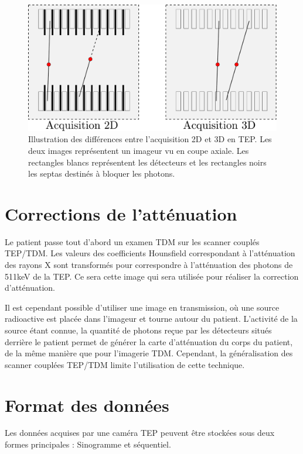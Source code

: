 \begin{figure}
\centering
\includegraphics[width=12cm]{images/2D3D}
\caption[Acquisitions 2D et 3D en TEP]{Illustration des différences entre l'acquisition 2D et 3D en TEP. Les deux images représentent un imageur vu en coupe axiale. Les rectangles blancs représentent les détecteurs et les rectangles noirs les septas destinés à bloquer les photons. }
\label{fig:2D3D}
\end{figure}


	\section{Corrections de l'atténuation}

\label{CorrectionAttenuation}

Le patient passe tout d'abord un examen TDM sur les scanner couplés TEP/TDM. Les valeurs des coefficients Hounsfield correspondant à l'atténuation des rayons X sont transformés pour correspondre à l'atténuation des photons de 511keV de la TEP. Ce sera cette image qui sera utilisée pour réaliser la correction d'atténuation. 

Il est cependant possible d'utiliser une image en transmission, où une source radioactive est placée dans l'imageur et tourne autour du patient. L'activité de la source étant connue, la quantité de photons reçue par les détecteurs situés derrière le patient permet de générer la carte d'atténuation du corps du patient, de la même manière que pour l'imagerie TDM. Cependant, la généralisation des scanner couplées TEP/TDM limite l'utilisation de cette technique.




	\section{Format des données}
Les données acquises par une caméra TEP peuvent être stockées sous deux formes principales : Sinogramme et séquentiel.
